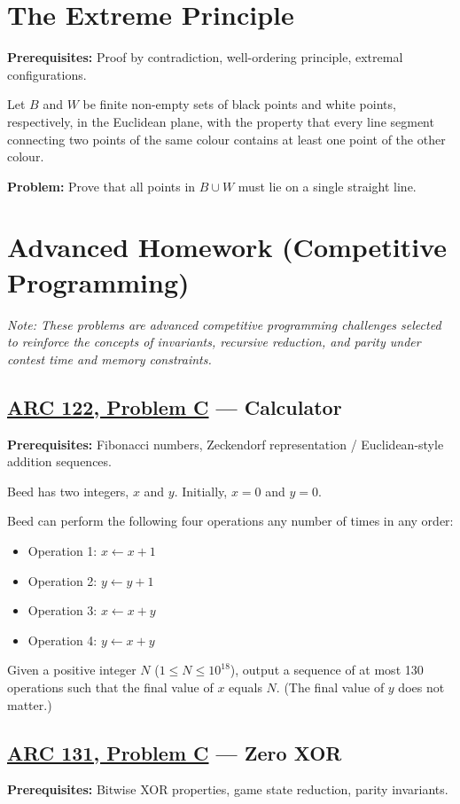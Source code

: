 \documentclass[12pt]{article}
\begin{document}
\section{The Extreme Principle}
\textbf{Prerequisites:} Proof by contradiction, well-ordering principle, extremal configurations.

Let $B$ and $W$ be finite non-empty sets of black points and white points, respectively, in the Euclidean plane, with the property that every line segment connecting two points of the same colour contains at least one point of the other colour.

\textbf{Problem:} Prove that all points in $B \cup W$ must lie on a single straight line.

\section{Advanced Homework (Competitive Programming)}
\noindent
\textit{Note: These problems are advanced competitive programming challenges selected to reinforce the concepts of invariants, recursive reduction, and parity under contest time and memory constraints.}

\subsection{\href{https://atcoder.jp/contests/arc122/tasks/arc122_c}{ARC 122, Problem C} --- Calculator}
\textbf{Prerequisites:} Fibonacci numbers, Zeckendorf representation / Euclidean-style addition sequences.

Beed has two integers, $x$ and $y$. Initially, $x = 0$ and $y = 0$.

Beed can perform the following four operations any number of times in any order:
\begin{itemize}
    \item Operation 1: $x \leftarrow x + 1$
    \item Operation 2: $y \leftarrow y + 1$
    \item Operation 3: $x \leftarrow x + y$
    \item Operation 4: $y \leftarrow x + y$
\end{itemize}

Given a positive integer $N$ ($1 \le N \le 10^{18}$), output a sequence of at most 130 operations such that the final value of $x$ equals $N$. (The final value of $y$ does not matter.)

\subsection{\href{https://atcoder.jp/contests/arc131/tasks/arc131_c}{ARC 131, Problem C} --- Zero XOR}
\textbf{Prerequisites:} Bitwise XOR properties, game state reduction, parity invariants.
\end{document}
